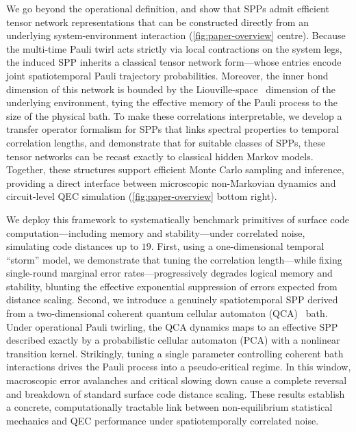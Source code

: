 We go beyond the operational definition, and show that SPPs admit efficient tensor network representations that can be constructed directly from an underlying system-environment interaction (\cref{fig:paper-overview} centre). Because the multi-time Pauli twirl acts strictly via local contractions on the system legs, the induced SPP inherits a classical tensor network form---whose entries encode joint spatiotemporal Pauli trajectory probabilities. Moreover, the inner bond dimension of this network is bounded by the Liouville-space~\cite{woodTensorNetworksGraphical2015} dimension of the underlying environment, tying the effective memory of the Pauli process to the size of the physical bath. To make these correlations interpretable, we develop a transfer operator formalism for SPPs that links spectral properties to temporal correlation lengths, and demonstrate that for suitable classes of SPPs, these tensor networks can be recast exactly to classical hidden Markov models. Together, these structures support efficient Monte Carlo sampling and inference, providing a direct interface between microscopic non-Markovian dynamics and circuit-level QEC simulation (\cref{fig:paper-overview} bottom right).

We deploy this framework to systematically benchmark primitives of surface code computation---including memory and stability---under correlated noise, simulating code distances up to \(19\). First, using a one-dimensional temporal ``storm'' model, we demonstrate that tuning the correlation length---while fixing single-round marginal error rates---progressively degrades logical memory and stability, blunting the effective exponential suppression of errors expected from distance scaling. Second, we introduce a genuinely spatiotemporal SPP derived from a two-dimensional coherent quantum cellular automaton (QCA)~\cite{schumacherReversibleQuantumCellular2004,farrellyReviewQuantumCellular2020} bath. Under operational Pauli twirling, the QCA dynamics maps to an effective SPP described exactly by a probabilistic cellular automaton (PCA) with a nonlinear transition kernel. Strikingly, tuning a single parameter controlling coherent bath interactions drives the Pauli process into a pseudo-critical regime. In this window, macroscopic error avalanches and critical slowing down cause a complete reversal and breakdown of standard surface code distance scaling. These results establish a concrete, computationally tractable link between non-equilibrium statistical mechanics and QEC performance under spatiotemporally correlated noise.

